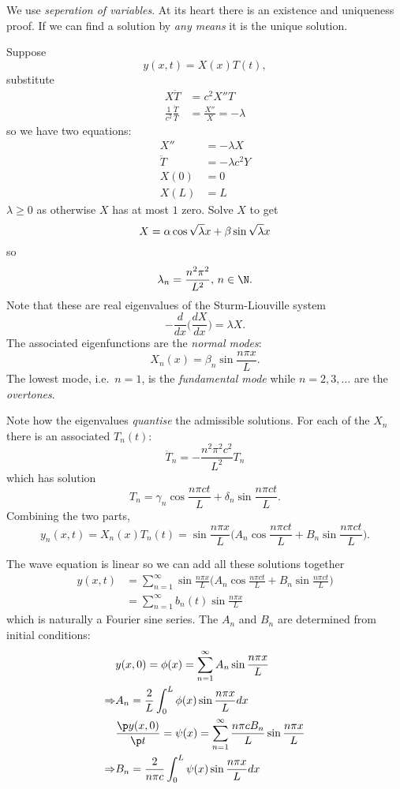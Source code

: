\documentclass[a4paper]{article}
\begin{document}
We use \emph{seperation of variables}. At its heart there is an existence and uniqueness proof. If we can find a solution by \emph{any means} it is the unique solution.

Suppose
\[
y(x,t) = X(x)T(t),
\]
substitute
\begin{align*}
  X \ddot{T} &= c^2X''T \\
  \frac{1}{c^2} \frac{\ddot{T}}{T} &= \frac{X''}{X} = -\lambda
\end{align*}
so we have two equations:
\begin{align*}
  X'' &= -\lambda X \\
  \ddot{T} &= -\lambda c^2 Y \\
  X(0) &= 0 \\
  X(L) &= L
\end{align*}
\(\lambda\geq0\) as otherwise \(X\) has at most \(1\) zero. Solve \(X\) to get
\[
  X = \alpha \cos \sqrt\lambda x + \beta \sin\sqrt\lambda x \\
\]
so
\[
  \lambda_n = \frac{n^2\pi^2}{L^2}, \, n \in \N.
\]
Note that these are real eigenvalues of the Sturm-Liouville system
\[
  -\frac{d}{dx} \big(\frac{dX}{dx} \big) = \lambda X.
\]
The associated eigenfunctions are the \emph{normal modes}:
\[
  X_n(x) = \beta_n \sin \frac{n\pi x}{L}.
\]
The lowest mode, i.e.\ \(n=1\), is the \emph{fundamental mode} while \(n=2,3,\dots\) are the \emph{overtones}.

Note how the eigenvalues \emph{quantise} the admissible solutions. For each of the \(X_n\) there is an associated \(T_n(t)\):
\[
  \ddot{T}_n = -\frac{n^2\pi^2c^2}{L^2}T_n
\]
which has solution
\[
  T_n = \gamma_n \cos \frac{n\pi ct}{L} + \delta_n \sin \frac{n\pi ct}{L}.
\]
Combining the two parts,
\[
  y_n(x,t) = X_n(x)T_n(t) = \sin \frac{n\pi x}{L} \Big( A_n \cos \frac{n\pi ct}{L} + B_n \sin \frac{n\pi ct}{L} \Big).
\]

The wave equation is linear so we can add all these solutions together
\begin{align*}
  y(x,t) &= \sum_{n=1}^{\infty} \sin \frac{n\pi x}{L} \Big( A_n \cos \frac{n\pi ct}{L} + B_n \sin \frac{n\pi ct}{L} \Big) \\
         &= \sum_{n=1}^{\infty} b_n(t) \sin \frac{n\pi x}{L}
\end{align*}
which is naturally a Fourier sine series. The \(A_n\) and \(B_n\) are determined from initial conditions:
\begin{align*}
  &y(x,0) = \phi(x) = \sum_{n=1}^{\infty} A_n \sin \frac{n\pi x}{L} \\
  \Rightarrow & A_n = \frac{2}{L} \int_{0}^{L} \phi(x) \sin \frac{n\pi x}{L} dx \\
  & \frac{\p y(x,0)}{\p t} = \psi(x) = \sum_{n=1}^{\infty} \frac{n\pi cB_n}{L} \sin \frac{n\pi x}{L} \\
  \Rightarrow & B_n = \frac{2}{n\pi c} \int_{0}^{L} \psi(x) \sin \frac{n\pi x}{L} dx
\end{align*}
\end{document}
